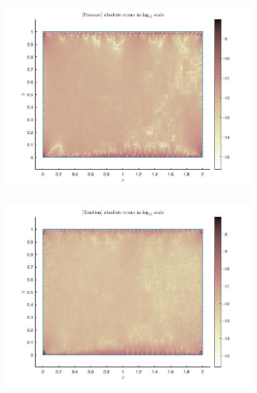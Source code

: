 \begin{figure}[H]
  \centering
  \begin{subfigure}[H]{0.45\textwidth}
    \centering
    \includegraphics[width=\textwidth]{figures/fig_sample_0.jpg}
  \end{subfigure}
  \hfill
  \begin{subfigure}[H]{0.45\textwidth}
    \centering
    \includegraphics[width=\textwidth]{figures/fig_sample_1.jpg}
  \end{subfigure}
  \begin{subfigure}[H]{0.45\textwidth}
    \centering

\end{subfigure}
\end{figure}
